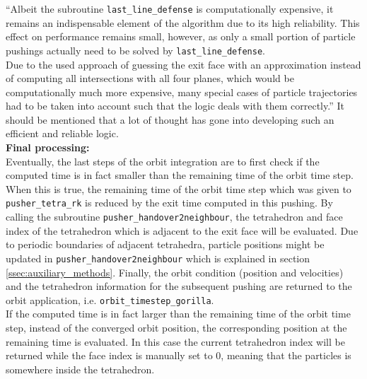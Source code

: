 \documentclass{TheMartianReport}
\begin{document}
%
``Albeit the subroutine \texttt{last\_line\_defense} is computationally expensive, it remains an indispensable element of the algorithm due to its high reliability. This effect on performance remains small, however, as only a small portion of particle pushings actually need to be solved by \texttt{last\_line\_defense}.\\
%
Due to the used approach of guessing the exit face with an approximation instead of computing all intersections with all four planes, which would be computationally much more expensive, many special cases of particle trajectories had to be taken into account such that the logic deals with them correctly.''\cite{bauer_master_2020}
It should be mentioned that a lot of thought has gone into developing such an efficient and reliable logic.\\


\textbf{Final processing:}\\
Eventually, the last steps of the orbit integration are to first check if the computed time is in fact smaller than the remaining time of the orbit time step.  When this is true, the remaining time of the orbit time step which was given to \texttt{pusher\_tetra\_rk} is reduced by the exit time computed in this pushing. By calling the subroutine  \texttt{pusher\_handover2neighbour}, the tetrahedron and face index of the tetrahedron which is adjacent to the exit face will be evaluated. Due to periodic boundaries of adjacent tetrahedra, particle positions might be updated in \texttt{pusher\_handover2neighbour} which is explained in section \ref{ssec:auxiliary_methods}.  Finally, the orbit condition (position and velocities) and the tetrahedron information for the subsequent pushing are returned to the orbit application, i.e. \texttt{orbit\_timestep\_gorilla}.\\
%
If the computed time is in fact larger than the remaining time of the orbit time step, instead of the converged orbit position, the corresponding position at the remaining time is evaluated. In this case the current tetrahedron index will be returned while the face index is manually set to $0$, meaning that the particles is somewhere inside the tetrahedron.\\
\end{document}
